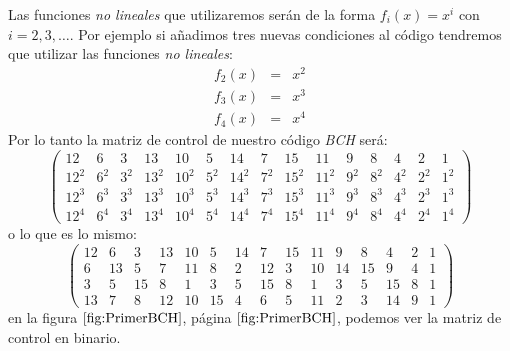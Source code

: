 Las funciones \emph{no lineales} que utilizaremos ser\'an de la forma
$f_i(x)=x^i$ con $i=2,3,\dots$. Por ejemplo si a\~nadimos tres nuevas
condiciones al c\'odigo tendremos que utilizar las funciones \emph{no lineales}:
\begin{eqnarray*}
f_2(x)&=&x^2\\
f_3(x)&=&x^3\\
f_4(x)&=&x^4
\end{eqnarray*}
Por lo tanto la matriz de control de nuestro c\'odigo \emph{BCH} ser\'a:
\begin{displaymath}
\left( \begin{array}{ccccccccccccccc}
12\ &6\ &3\ &13\ &10\ &5\ &14\ &7\ &15\ &11\ &9\ &8\ &4\ &2\ &1\ \\
12^2&6^2&3^2&13^2&10^2&5^2&14^2&7^2&15^2&11^2&9^2&8^2&4^2&2^2&1^2\\
12^3&6^3&3^3&13^3&10^3&5^3&14^3&7^3&15^3&11^3&9^3&8^3&4^3&2^3&1^3\\
12^4&6^4&3^4&13^4&10^4&5^4&14^4&7^4&15^4&11^4&9^4&8^4&4^4&2^4&1^4
\end{array} \right)
\end{displaymath}
o lo que es lo mismo:
\begin{displaymath}
\left( \begin{array}{ccccccccccccccc}
12&6&3&13&10&5&14&7&15&11&9&8&4&2&1\\
6&13&5&7&11&8&2&12&3&10&14&15&9&4&1\\
3&5&15&8&1&3&5&15&8&1&3&5&15&8&1\\
13&7&8&12&10&15&4&6&5&11&2&3&14&9&1
\end{array} \right)
\end{displaymath}
en la figura $\ref{fig:PrimerBCH}$, p\'agina $\pageref{fig:PrimerBCH}$, podemos
ver la matriz de control en binario.
